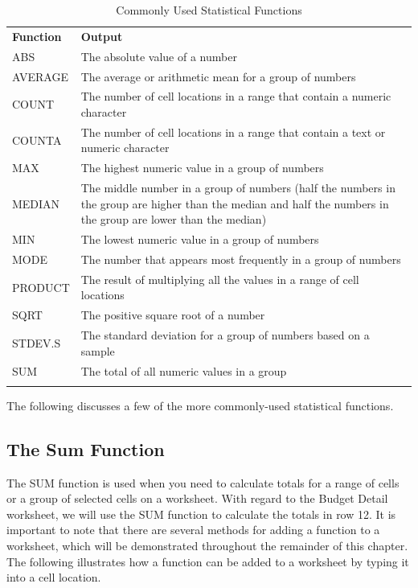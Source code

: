 {\small
	\begin{longtable}{p{0.75in}p{3.0in}}
		\textbf{Function} & \textbf{Output} \endhead
		\hline \\
		ABS & The absolute value of a number\\
		AVERAGE & The average or arithmetic mean for a group of numbers\\
		COUNT & The number of cell locations in a range that contain a numeric character\\
		COUNTA & The number of cell locations in a range that contain a text or numeric character\\
		MAX & The highest numeric value in a group of numbers\\
		MEDIAN & The middle number in a group of numbers (half the numbers in the group are higher than the median and half the numbers in the group are lower than the median)\\
		MIN & The lowest numeric value in a group of numbers\\
		MODE & The number that appears most frequently in a group of numbers\\
		PRODUCT & The result of multiplying all the values in a range of cell locations\\
		SQRT & The positive square root of a number\\
		STDEV.S & The standard deviation for a group of numbers based on a sample\\
		SUM & The total of all numeric values in a group\\
		\caption{Commonly Used Statistical Functions}
		\label{02:tab04}
	\end{longtable}
}

The following discusses a few of the more commonly-used statistical functions.

\subsection{The Sum Function}

The SUM function is used when you need to calculate totals for a range of cells or a group of selected cells on a worksheet. With regard to the Budget Detail worksheet, we will use the SUM function to calculate the totals in row 12. It is important to note that there are several methods for adding a function to a worksheet, which will be demonstrated throughout the remainder of this chapter. The following illustrates how a function can be added to a worksheet by typing it into a cell location.

